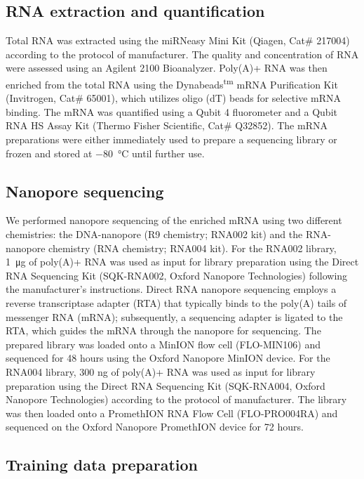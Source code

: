\documentclass[pdflatex, sn-mathphys-num, lineno]{sn-jnl}%
\theoremstyle{thmstyleone}%
\theoremstyle{thmstyletwo}%
\theoremstyle{thmstylethree}%
\begin{document}
\subsection{RNA extraction and quantification}

Total RNA was extracted using the miRNeasy Mini Kit (Qiagen, Cat\# 217004) according to the protocol of manufacturer.
The quality and concentration of RNA were assessed using an Agilent 2100 Bioanalyzer.
Poly(A)+ RNA was then enriched from the total RNA using the Dynabeads\textsuperscript{tm} mRNA Purification Kit (Invitrogen, Cat\# 65001), which utilizes oligo (dT) beads for selective mRNA binding.
The mRNA was quantified using a Qubit 4 fluorometer and a Qubit RNA HS Assay Kit (Thermo Fisher Scientific, Cat\# Q32852).
The mRNA preparations were either immediately used to prepare a sequencing library or frozen and stored at \SI{-80}{\degreeCelsius} until further use.

\subsection{Nanopore sequencing}

We performed nanopore sequencing of the enriched mRNA using two different chemistries: the DNA-nanopore (R9 chemistry; RNA002 kit) and the RNA-nanopore chemistry (RNA chemistry; RNA004 kit).
For the RNA002 library, \SI{1}{\micro\gram} of poly(A)+ RNA was used as input for library preparation using the Direct RNA Sequencing Kit (SQK-RNA002, Oxford Nanopore Technologies) following the manufacturer's instructions.
Direct RNA nanopore sequencing employs a reverse transcriptase adapter (RTA) that typically binds to the poly(A) tails of messenger RNA (mRNA); subsequently, a sequencing adapter is ligated to the RTA, which guides the mRNA through the nanopore for sequencing.
The prepared library was loaded onto a MinION flow cell (FLO-MIN106) and sequenced for 48 hours using the Oxford Nanopore MinION device.
For the RNA004 library, 300 ng of poly(A)+ RNA was used as input for library preparation using the Direct RNA Sequencing Kit (SQK-RNA004, Oxford Nanopore Technologies) according to the protocol of manufacturer.
The library was then loaded onto a PromethION RNA Flow Cell (FLO-PRO004RA) and sequenced on the Oxford Nanopore PromethION device for 72 hours.


\subsection{Training data preparation}\label{ssec:data}
\end{document}
